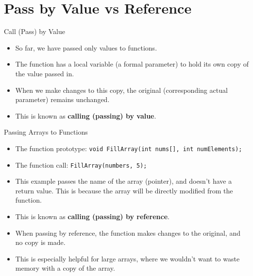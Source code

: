 \documentclass[graphics]{beamer}
\begin{document}
\section{Pass by Value vs Reference}
\begin{frame}{Call (Pass) by Value}
    \begin{itemize}
        \item So far, we have passed only values to functions.
        \item The function has a local variable (a formal parameter) to hold its own copy of the value passed in.
        \item When we make changes to this copy, the original (corresponding actual parameter) remains unchanged.
        \item This is known as \textbf{calling (passing) by value}.
    \end{itemize}
\end{frame}

\begin{frame}{Passing Arrays to Functions}
    \begin{itemize}
        \item The function prototype: \texttt{void FillArray(int nums[], int numElements);}
        \item The function call: \texttt{FillArray(numbers, 5);}
        \item This example passes the name of the array (pointer), and doesn't have a return value. This is because the array will be directly modified from the function.
        \item This is known as \textbf{calling (passing) by reference}.
        \item When passing by reference, the function makes changes to the original, and no copy is made.
        \item This is especially helpful for large arrays, where we wouldn't want to waste memory with a copy of the array.
    \end{itemize}
\end{frame}
\end{document}
